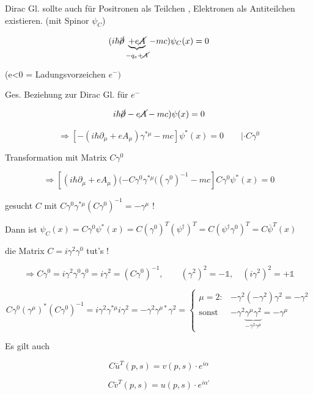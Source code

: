Dirac Gl. sollte auch für Positronen als Teilchen , Elektronen als Antiteilchen existieren. (mit Spinor \(\psi_C\))

\[(i\hbar \cancel \partial\underbrace{+e\cancel A}_{-q_e+\cancel A}-mc)\psi_C(x) = 0\]

(e<0 = Ladungsvorzeichen \(e^-)\)

Ges. Beziehung zur Dirac Gl. für \(e^-\)

\[ i\hbar\cancel \partial - e\cancel A - mc)\psi(x) = 0 \]

\[\Rightarrow [-(i\hbar\partial_\mu+eA_\mu)\gamma^{*\mu} - mc]\psi^*(x) = 0\qquad |\cdot C\gamma^0\]

Transformation mit Matrix \(C\gamma^0\)

\[\Rightarrow  [(i\hbar\partial_\mu+eA_\mu)(-C\gamma^0\gamma^{*\mu}((\gamma^0)^{-1} - mc]C\gamma^0\psi^*(x) = 0  \]


gesucht \(C\) mit \( C\gamma^0\gamma^{*\mu} (C\gamma^0)^{-1} = -\gamma^\mu\) !

Dann ist \(\psi_C (x) = C\gamma^0\psi^*(x) = C(\gamma^0)^T(\psi^\dagger)^T = C(\psi^\dagger\gamma^0)^T = C\overline \psi^T(x)\)

die Matrix \(C=i\gamma^2\gamma^0\) tut's !

\[\Rightarrow C\gamma^0 = i\gamma^2\gamma^0\gamma^0 = i\gamma^2 = (C\gamma^0)^{-1},\qquad (\gamma^2)^2 = -\mathbb 1, \quad (i\gamma^2)^2 = +\mathbb 1\]

\[C\gamma^0(\gamma^\mu)^*(C\gamma^0)^{-1} = i\gamma^2\gamma^{*\mu}i\gamma^2 = -\gamma^2\gamma^{\mu*}\gamma^2 = \begin{cases}
  \mu = 2:  & -\gamma^2(-\gamma^2)\gamma^2 = -\gamma^2\\
  \text{sonst }&-\gamma^2\underbrace{\gamma^\mu\gamma^2}_{-\gamma^2\gamma^\mu} = -\gamma^\mu
\end{cases}\]

Es gilt auch

\[C\overline u^T (p,s) = v(p,s) \cdot e^{i\alpha}\]

\[C\overline v^T (p,s) = u(p,s) \cdot e^{i\alpha'}\]

